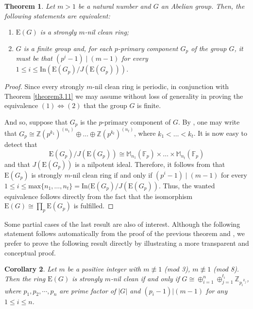 \documentclass[12pt]{amsart}
\newtheorem{thm}{Theorem}[section]
\newtheorem{cor}[thm]{Corollary}
\theoremstyle{definition}
\theoremstyle{remark}
\numberwithin{equation}{section}
\begin{document}
\begin{thm}\label{theorem3.12}
Let $m>1$ be a natural number and $G$ an Abelian group. Then, the following statements are equivalent:

\begin{enumerate}
\item[\rm{(1)}] $\mathrm{E}(G)$ is a strongly $m$-nil clean ring;

\item[\rm{(2)}] $G$ is a finite group and, for each $p$-primary component $G_p$ of the group $G$, it must be that $(p^i-1) \mid (m-1)$ for every $1\leq i\leq \mathrm{In}(\mathrm{E}(G_p)/J(\mathrm{E}(G_p)))$.

\end{enumerate}
\end{thm}

\begin{proof} Since every strongly $m$-nil clean ring is periodic, in conjunction with Theorem \ref{theorem3.11} we may assume without loss of generality in proving the equivalence $(1) \Leftrightarrow (2)$ that the group $G$ is finite.

And so, suppose that $G_p$ is the $p$-primary component of $G.$ By \cite{fuchs}, one may write that $G_p\cong \mathbb{Z}(p^{k_1})^{(n_1)}\oplus\ldots \oplus \mathbb{Z}(p^{k_t})^{(n_t)}$, where $k_1<\ldots<k_t$. It is now easy to detect that $$\mathrm{E}(G_p)/J(\mathrm{E}(G_p))\cong \mathbb{M}_{n_1}(\mathbb{F}_p)\times\ldots \times  \mathbb{M}_{n_t}(\mathbb{F}_p)$$
and that $J(\mathrm{E}(G_p))$ is a nilpotent ideal. Therefore, it follows from \cite[Theorem 8]{AT} that $\mathrm{E}(G_p)$ is strongly $m$-nil clean ring if and only if $(p^i-1)\mid (m-1)$ for every $1\leq i\leq \mathrm{max}\{n_1,\ldots, n_t\}=\mathrm{In}(\mathrm{E}(G_p)/J(\mathrm{E}(G_p))$. Thus, the wanted equivalence follows directly from the fact that the isomorphism $\mathrm{E}(G)\cong \prod_p \mathrm{E}(G_p)$ is fulfilled.
\end{proof}

Some partial cases of the last result are also of interest. Although the following statement follows automatically from the proof of the previous theorem and \cite[Corollary 19]{AT}, we prefer to prove the following result directly by illustrating a more transparent and conceptual proof.

\begin{cor}\label{corollary3.13}
Let $m$ be a positive integer with $m \not\equiv 1$ (mod 3), $m \not\equiv 1$ (mod 8). Then the ring $\mathrm{E}(G)$ is strongly $m$-nil clean if and only if $G\cong \oplus_{i=1}^n \oplus_{j=1}^{t_i} \mathbb{Z}_{{p_i}^{k_j}}$, where $p_1,p_2, \cdots,p_n$ are prime factor of $|G|$ and $(p_i-1)|(m-1)$ for any $1 \leq i \leq n$.
\end{cor}
\end{document}
